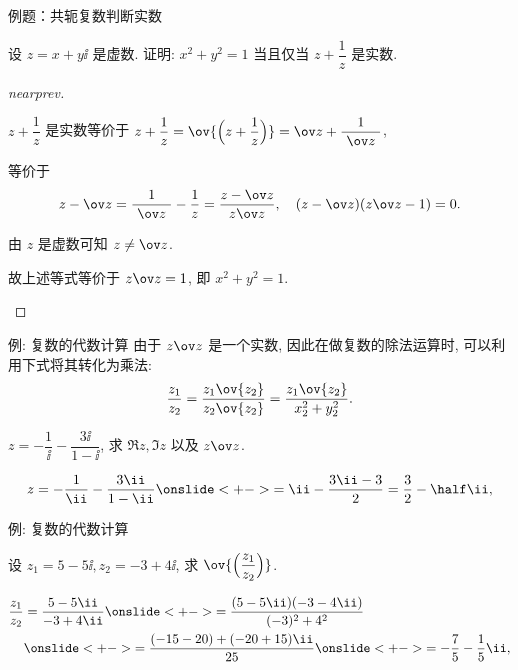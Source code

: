 \begin{frame}{例题：共轭复数判断实数}
	\onslide<+->
	\begin{example}[nearnext]
		设 $z=x+y\ii$ 是虚数.
		证明: $x^2+y^2=1$ 当且仅当 $z+\dfrac 1z$ 是实数.
	\end{example}
	\onslide<+->
	\begin{proof}[nearprev]
		\begin{itemize*}
			\item $z+\dfrac 1z$ 是实数等价于
				$z+\dfrac 1z=\ov{\Bigl(z+\dfrac 1z\Bigr)}=\ov z+\dfrac1{~\ov z~}$,
			\item 等价于
			\[
				z-\ov z=\frac1{~\ov z~}-\frac1z=\frac{z-\ov z}{z\ov z},\quad (z-\ov z)(z\ov z-1)=0.
			\]
			\item 由 $z$ 是虚数可知 $z\neq \ov z$.
			\item 故上述等式等价于 $z\ov z=1$, 即 $x^2+y^2=1$.\qedhere
		\end{itemize*}
	\end{proof}
\end{frame}


\begin{frame}{例: 复数的代数计算}
	\onslide<+->
	由于 $z\ov z$ 是一个实数,
	\onslide<+->
	因此在做复数的除法运算时, 可以利用下式将其转化为乘法:
	\[
		\dfrac{z_1}{z_2}=\dfrac{z_1\ov{z_2}}{z_2\ov{z_2}}=\dfrac{z_1\ov{z_2}}{x_2^2+y_2^2}.
	\]
	\bigdel
	\onslide<+->
	\begin{example}[nearnext]
		$z=-\dfrac1\ii-\dfrac{3\ii}{1-\ii }$, 求 $\Re z,\Im z$ 以及 $z\ov z$.
	\end{example}
	\onslide<+->
	\begin{solution}[nearprev]
		\[
			z=-\frac1\ii-\frac{3\ii}{1-\ii }
			\onslide<+->{=\ii-\frac{3\ii-3}2=\frac32-\half \ii,}
		\]
		\onslide<+->{%
		\[
			\Re z=\frac32,\quad\Im z=-\half ,\quad
			z\ov z=\Bigl(\frac32\Bigr)^2+\Bigl(-\half\Bigr)^2=\frac52.
		\]
		}
		\bigdel
	\end{solution}
\end{frame}


\begin{frame}{例: 复数的代数计算}
	\onslide<+->
	\begin{example}[nearnext]
		设 $z_1=5-5\ii,z_2=-3+4\ii$, 求 $\ov{\Bigl(\dfrac{z_1}{z_2}\Bigr)}$.
	\end{example}
	\onslide<+->
	\begin{solution}[nearprev]
		\begin{align*}
			\frac{z_1}{z_2}&=\frac{5-5\ii}{-3+4\ii}
			\onslide<+->{=\frac{(5-5\ii)(-3-4\ii)}{(-3)^2+4^2}}\\
			&\onslide<+->{=\frac{(-15-20)+(-20+15)\ii}{25}}
			\onslide<+->{=-\frac75-\frac15\ii,}
		\end{align*}
		\onslide<+->{%
			因此 $\ov{\Bigl(\dfrac{z_1}{z_2}\Bigr)}=-\dfrac75+\dfrac15\ii$.
		}
	\end{solution}
\end{frame}



